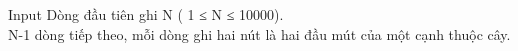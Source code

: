 Input
Dòng đầu tiên ghi N ( 1 ≤ N ≤ 10000).
\\N-1 dòng tiếp theo, mỗi dòng ghi hai nút là hai đầu mút của một cạnh thuộc cây.